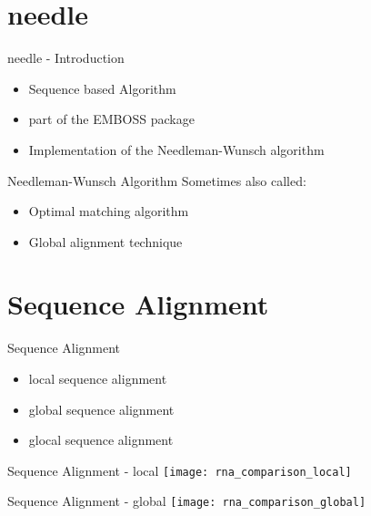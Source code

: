 
\section{needle}

\begin{frame}[c]{needle - Introduction}
    \begin{itemize}
    \item Sequence based Algorithm \newline
    \pause
    \item part of the EMBOSS package \newline
    \pause
    \item Implementation of the Needleman-Wunsch algorithm
    \end{itemize}
\end{frame}


\begin{frame}[c]{Needleman-Wunsch Algorithm}
    Sometimes also called: \newline
    \begin{itemize}
    \pause
    \item Optimal matching algorithm \newline
    \pause
    \item Global alignment technique
    \end{itemize}
\end{frame}


\section{Sequence Alignment}

\begin{frame}[c]{Sequence Alignment}
    \begin{itemize}
    \item local sequence alignment \newline
    \pause
    \item global sequence alignment \newline
    \pause
    \item glocal sequence alignment
    \end{itemize}
\end{frame}


\begin{frame}[c]{Sequence Alignment - local}
    \texttt{[image: rna\_comparison\_local]}
\end{frame}

\begin{frame}[c]{Sequence Alignment - global}
    \texttt{[image: rna\_comparison\_global]}
\end{frame}

